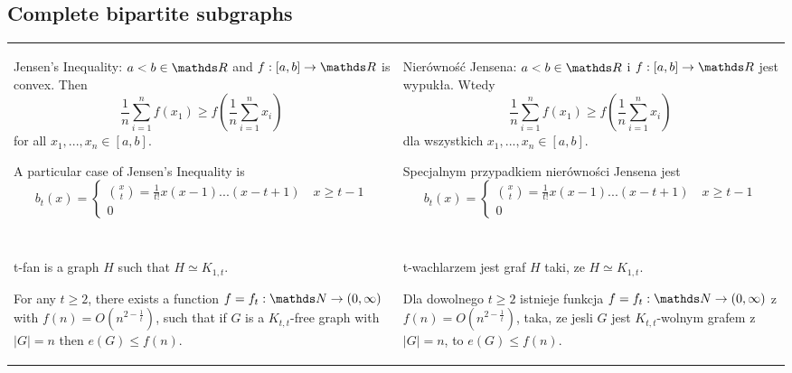 \subsection{Complete bipartite subgraphs}

\begin{tabularx}{\textwidth}{ X!{\color{git90gray}\vrule} X }

    {\color{def}Jensen's Inequality}: $a<b\in\R$ and $f:[a,b]\to\R$ is convex. Then
    $$\frac1n\sum\limits_{i=1}^nf(x_1)\geq f(\frac1n\sum\limits_{i=1}^nx_i)$$
    for all $x_1,...,x_n\in[a,b]$.
    \smallskip

    A particular case of Jensen's Inequality is
    $$b_t(x)=\begin{cases}
        {x\choose t}=\frac1{t!}x(x-1)...(x-t+1)\quad x\geq t-1\\
        0
    \end{cases}$$

    &

    {\color{def}Nierówność Jensena}: $a<b\in\R$ i $f:[a,b]\to\R$ jest wypukła. Wtedy
    $$\frac1n\sum\limits_{i=1}^nf(x_1)\geq f(\frac1n\sum\limits_{i=1}^nx_i)$$
    dla wszystkich $x_1,...,x_n\in[a,b]$.
    \smallskip

    Specjalnym przypadkiem nierówności Jensena jest
    $$b_t(x)=\begin{cases}
        {x\choose t}=\frac1{t!}x(x-1)...(x-t+1)\quad x\geq t-1\\
        0
    \end{cases}$$
    \\

    & \\

    \hline

    & \\

    {\color{def}t-fan} is a graph $H$ such that $H\simeq K_{1,t}$.

    For any $t\geq2$, there exists a function $f=f_t:\N\to(0,\infty)$ with $f(n)=O(n^{2-\frac1t})$, such that if $G$ is a $K_{t,t}$-free graph with $|G|=n$ then $e(G)\leq f(n)$.

    &

    {\color{def}t-wachlarzem} jest graf $H$ taki, ze $H\simeq K_{1,t}$.

    Dla dowolnego $t\geq2$ istnieje funkcja $f=f_t:\N\to(0, \infty)$ z $f(n)=O(n^{2-\frac1t})$, taka, ze jesli $G$ jest $K_{t,t}$-wolnym grafem z $|G|=n$, to $e(G)\leq f(n)$.

\end{tabularx}

